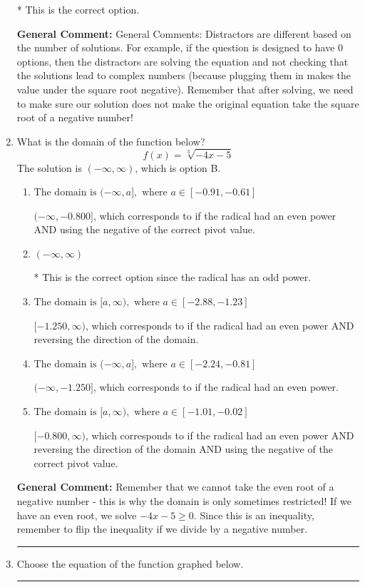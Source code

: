\documentclass{extbook}[14pt]
\newcommand{\litem}[1]{\item #1

\rule{\textwidth}{0.4pt}}
\begin{document}
\begin{enumerate}
{\begin{enumerate}[label=\Alph*.]
* This is the correct option.
\end{enumerate}

\textbf{General Comment:} General Comments: Distractors are different based on the number of solutions. For example, if the question is designed to have 0 options, then the distractors are solving the equation and not checking that the solutions lead to complex numbers (because plugging them in makes the value under the square root negative). Remember that after solving, we need to make sure our solution does not make the original equation take the square root of a negative number!
}
\litem{
What is the domain of the function below?
\[ f(x) = \sqrt[3]{-4 x - 5} \]
The solution is \( (-\infty, \infty) \), which is option B.\begin{enumerate}[label=\Alph*.]
\item \( \text{The domain is } (-\infty, a], \text{   where } a \in [-0.91, -0.61] \)

$(-\infty, -0.800]$, which corresponds to if the radical had an even power AND using the negative of the correct pivot value.
\item \( (-\infty, \infty) \)

* This is the correct option since the radical has an odd power.
\item \( \text{The domain is } [a, \infty), \text{   where } a \in [-2.88, -1.23] \)

$[-1.250, \infty)$, which corresponds to if the radical had an even power AND reversing the direction of the domain.
\item \( \text{The domain is } (-\infty, a], \text{   where } a \in [-2.24, -0.81] \)

$(-\infty, -1.250]$, which corresponds to if the radical had an even power.
\item \( \text{The domain is } [a, \infty), \text{   where } a \in [-1.01, -0.02] \)

$[-0.800, \infty)$, which corresponds to if the radical had an even power AND reversing the direction of the domain AND using the negative of the correct pivot value.
\end{enumerate}

\textbf{General Comment:} Remember that we cannot take the even root of a negative number - this is why the domain is only sometimes restricted! If we have an even root, we solve $-4 x - 5 \geq 0$. Since this is an inequality, remember to flip the inequality if we divide by a negative number.
}
\litem{
Choose the equation of the function graphed below.

}
\end{enumerate}
\end{document}
